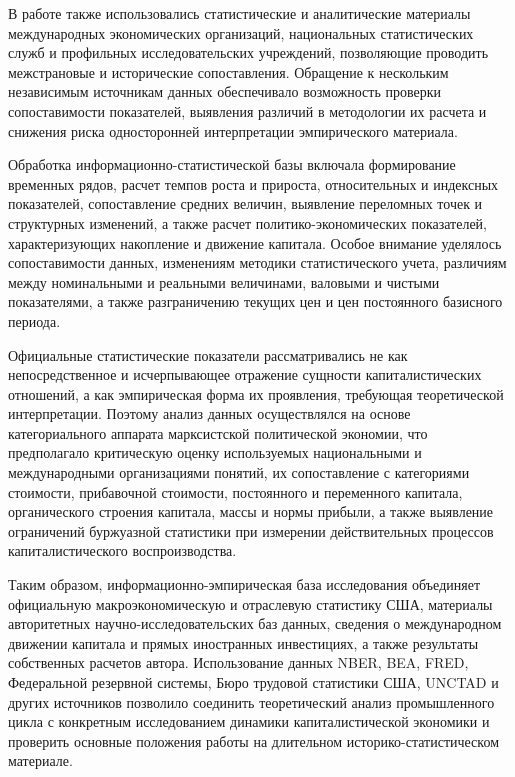 В работе также использовались статистические и аналитические материалы международных экономических организаций, национальных статистических служб и профильных исследовательских учреждений, позволяющие проводить межстрановые и исторические сопоставления. Обращение к нескольким независимым источникам данных обеспечивало возможность проверки сопоставимости показателей, выявления различий в методологии их расчета и снижения риска односторонней интерпретации эмпирического материала.

Обработка информационно-статистической базы включала формирование временных рядов, расчет темпов роста и прироста, относительных и индексных показателей, сопоставление средних величин, выявление переломных точек и структурных изменений, а также расчет политико-экономических показателей, характеризующих накопление и движение капитала. Особое внимание уделялось сопоставимости данных, изменениям методики статистического учета, различиям между номинальными и реальными величинами, валовыми и чистыми показателями, а также разграничению текущих цен и цен постоянного базисного периода.

Официальные статистические показатели рассматривались не как непосредственное и исчерпывающее отражение сущности капиталистических отношений, а как эмпирическая форма их проявления, требующая теоретической интерпретации. Поэтому анализ данных осуществлялся на основе категориального аппарата марксистской политической экономии, что предполагало критическую оценку используемых национальными и международными организациями понятий, их сопоставление с категориями стоимости, прибавочной стоимости, постоянного и переменного капитала, органического строения капитала, массы и нормы прибыли, а также выявление ограничений буржуазной статистики при измерении действительных процессов капиталистического воспроизводства.

Таким образом, информационно-эмпирическая база исследования объединяет официальную макроэкономическую и отраслевую статистику США, материалы авторитетных научно-исследовательских баз данных, сведения о международном движении капитала и прямых иностранных инвестициях, а также результаты собственных расчетов автора. Использование данных NBER, BEA, FRED, Федеральной резервной системы, Бюро трудовой статистики США, UNCTAD и других источников позволило соединить теоретический анализ промышленного цикла с конкретным исследованием динамики капиталистической экономики и проверить основные положения работы на длительном историко-статистическом материале.

